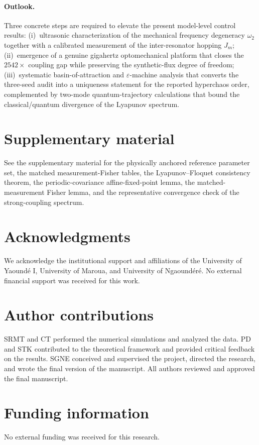 \documentclass[Phys]{SciPost}
\begin{document}
\paragraph{Outlook.}
Three concrete steps are required to elevate the present model-level control results: (i)~ultrasonic characterization of the mechanical frequency degeneracy $\omega_2$ together with a calibrated measurement of the inter-resonator hopping $J_m$; (ii)~emergence of a genuine gigahertz optomechanical platform that closes the $\num{2542}\times$ coupling gap while preserving the synthetic-flux degree of freedom; (iii)~systematic basin-of-attraction and $\varepsilon$-machine analysis that converts the three-seed audit into a uniqueness statement for the reported hyperchaos order, complemented by two-mode quantum-trajectory calculations that bound the classical/quantum divergence of the Lyapunov spectrum.

\section*{Supplementary material}
See the supplementary material for the physically anchored reference parameter set, the matched measurement-Fisher tables, the Lyapunov--Floquet consistency theorem, the periodic-covariance affine-fixed-point lemma, the matched-measurement Fisher lemma, and the representative convergence check of the strong-coupling spectrum.

\section*{Acknowledgments}
We acknowledge the institutional support and affiliations of the University of Yaound\'e I, University of Maroua, and University of Ngaound\'er\'e. No external financial support was received for this work.

\section*{Author contributions}
SRMT and CT performed the numerical simulations and analyzed the data. PD and STK contributed to the theoretical framework and provided critical feedback on the results. SGNE conceived and supervised the project, directed the research, and wrote the final version of the manuscript. All authors reviewed and approved the final manuscript.

\section*{Funding information}
No external funding was received for this research.
\end{document}
